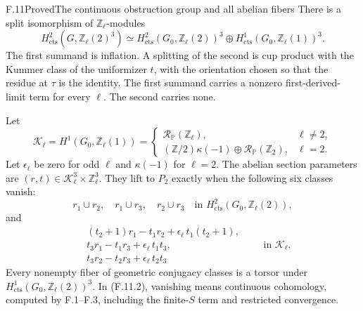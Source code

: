 \begin{statement}{F.11}{Proved}{The continuous obstruction group and all abelian fibers}
There is a split isomorphism of $\mathbb Z_\ell$-modules
\[
 H^2_{\mathrm{cts}}(G,\mathbb Z_\ell(2)^3)
 \simeq
 H^2_{\mathrm{cts}}(G_0,\mathbb Z_\ell(2))^3
 \oplus H^1_{\mathrm{cts}}(G_0,\mathbb Z_\ell(1))^3.       \tag{F.11.1}
\]
The first summand is inflation. A splitting of the second is
cup product with the Kummer class of the uniformizer $t$, with
the orientation chosen so that the residue at $\tau$ is the identity.
The first summand carries a nonzero first-derived-limit term for
every $\ell$. The second carries none.

Let
\[
 \mathscr K_\ell=H^1(G_0,\mathbb Z_\ell(1))
 =
 \begin{cases}
 \mathcal R_{\mathbb P}(\mathbb Z_\ell),&\ell\ne2,\\
 (\mathbb Z/2)\kappa(-1)\oplus
       \mathcal R_{\mathbb P}(\mathbb Z_2),&\ell=2.
 \end{cases}
\]
Let $\epsilon_\ell$ be zero for odd $\ell$ and $\kappa(-1)$ for
$\ell=2$. The abelian section parameters are
$(r,t)\in\mathscr K_\ell^3\times\mathbb Z_\ell^3$.
They lift to $P_2$ exactly when the following six classes vanish:
\[
 r_1\cup r_2,\quad r_1\cup r_3,\quad r_2\cup r_3
       \quad\text{in }H^2_{\mathrm{cts}}(G_0,\mathbb Z_\ell(2)), \tag{F.11.2}
\]
and
\[
 \begin{split}
 &(t_2+1)r_1-t_1r_2+\epsilon_\ell\,t_1(t_2+1),\\
 &t_3r_1-t_1r_3+\epsilon_\ell\,t_1t_3,\\
 &t_3r_2-t_2r_3+\epsilon_\ell\,t_2t_3
 \end{split}
 \qquad\text{in }\mathscr K_\ell.                         \tag{F.11.3}
\]
Every nonempty fiber of geometric conjugacy classes is a torsor under
$H^1_{\mathrm{cts}}(G_0,\mathbb Z_\ell(2))^3$.
In (F.11.2), vanishing means continuous cohomology, computed by
F.1--F.3, including the finite-$S$ term and restricted convergence.
\end{statement}
